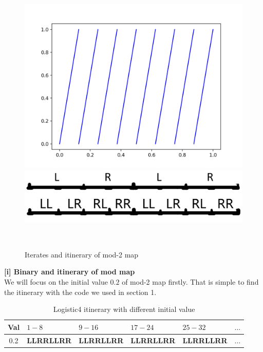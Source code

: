\documentclass[12pt]{article}
\theoremstyle{plain}
\begin{document}
\begin{figure}[H]
\begin{minipage}[c][0.24\width]{0.24\textwidth}
   \includegraphics[width=\textwidth]{figure/section3/mod2-ite3.png}
\end{minipage}
\begin{minipage}[c][0.24\width]{0.24\textwidth}
   \centering
   \includegraphics[width=\textwidth]{figure/section3/mod2-itinerary.png}
\end{minipage}
\\[3ex]\caption{Iterates and itinerary of mod-2 map}\label{mod-2-map}
\end{figure}


\textbf{[i] Binary and itinerary of mod map}
\\\noindent We will focus on the initial value $0.2$ of mod-2 map firstly. That is simple to find the itinerary with the code we used in section 1.

\begin{table}[H]
\centering  
\caption{Logistic4 itinerary with different initial value}  
\begin{tabular}{|c||l|l|l|l|l|}
\hline
Val  & $1-8$              & $9-16$             & $17-24$             & $25-32$             & $\ldots$ \\
\hline
0.2 & \textbf{LLRRLLRR} & \textbf{LLRRLLRR} & \textbf{LLRRLLRR} & \textbf{LLRRLLRR} & $\ldots$ \\
\hline
\end{tabular}  
\end{table}
\end{document}
